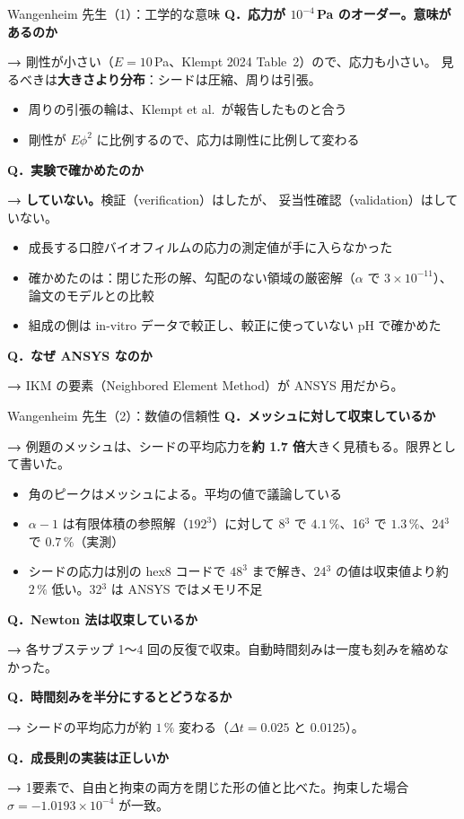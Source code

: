 \documentclass[aspectratio=169,11pt]{beamer}
\newcommand{\Q}[1]{\textbf{Q．#1}}
\newcommand{\A}[1]{\vspace{2pt}\colorbox{c3!10}{\parbox{0.95\linewidth}{%
  \small\textbf{→ }#1}}\vspace{3pt}}
\begin{document}
\begin{frame}{Wangenheim 先生（1）：工学的な意味}
\small\Q{応力が $10^{-4}$\,Pa のオーダー。意味があるのか}
\A{剛性が小さい（$E=10$\,Pa、Klempt 2024 Table~2）ので、応力も小さい。
見るべきは\textbf{大きさより分布}：シードは圧縮、周りは引張。}
\begin{itemize}\footnotesize
  \item 周りの引張の輪は、Klempt et al.\ が報告したものと合う
  \item 剛性が $E\phi^2$ に比例するので、応力は剛性に比例して変わる
\end{itemize}
\vspace{3pt}
\small\Q{実験で確かめたのか}
\A{\textcolor{copen}{\textbf{していない。}}検証（verification）はしたが、
妥当性確認（validation）はしていない。}
\begin{itemize}\footnotesize
  \item 成長する口腔バイオフィルムの応力の測定値が手に入らなかった
  \item 確かめたのは：閉じた形の解、勾配のない領域の厳密解（$\alpha$ で $3\times10^{-11}$）、
        論文のモデルとの比較
  \item 組成の側は in-vitro データで較正し、較正に使っていない pH で確かめた
\end{itemize}
\vspace{3pt}
\small\Q{なぜ ANSYS なのか}
\A{IKM の要素（Neighbored Element Method）が ANSYS 用だから。}
\end{frame}

\begin{frame}{Wangenheim 先生（2）：数値の信頼性}
\small\Q{メッシュに対して収束しているか}
\A{例題のメッシュは、シードの平均応力を\textbf{約 1.7 倍}大きく見積もる。限界として書いた。}
\begin{itemize}\footnotesize
  \item 角のピークはメッシュによる。平均の値で議論している
  \item $\alpha-1$ は有限体積の参照解（$192^3$）に対して 8$^3$ で $4.1\,\%$、16$^3$ で $1.3\,\%$、24$^3$ で $0.7\,\%$（実測）
  \item シードの応力は別の hex8 コードで $48^3$ まで解き、24$^3$ の値は収束値より約 $2\,\%$ 低い。32$^3$ は ANSYS ではメモリ不足
\end{itemize}
\vspace{3pt}
\small\Q{Newton 法は収束しているか}
\A{各サブステップ 1〜4 回の反復で収束。自動時間刻みは一度も刻みを縮めなかった。}
\vspace{3pt}
\small\Q{時間刻みを半分にするとどうなるか}
\A{シードの平均応力が約 $1\,\%$ 変わる（$\Delta t=0.025$ と $0.0125$）。}
\vspace{3pt}
\small\Q{成長則の実装は正しいか}
\A{1要素で、自由と拘束の両方を閉じた形の値と比べた。拘束した場合
$\sigma=-1.0193\times10^{-4}$ が一致。}
\end{frame}
\end{document}
